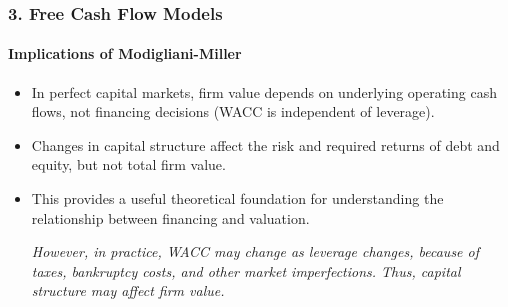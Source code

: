 \documentclass{beamer}
\begin{document}
\begin{frame}[t]
    \frametitle{3. Free Cash Flow Models}
    \framesubtitle{Implications of Modigliani-Miller}

    \begin{itemize}
        \item In perfect capital markets, firm value depends on
        underlying operating cash flows, not financing decisions (WACC is independent of leverage).

        \item Changes in capital structure affect the risk and
        required returns of debt and equity, but not total firm value.

        \item This provides a useful theoretical foundation for
        understanding the relationship between financing and valuation.

        \textit{However, in practice, WACC may change as leverage changes, because of taxes, bankruptcy costs, and other market imperfections. Thus, capital structure may affect firm value.}
    \end{itemize}

\end{frame}
\end{document}
